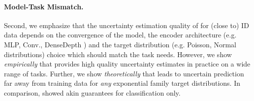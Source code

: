 \paragraph{Model-Task Mismatch.} Second, we emphasize that the uncertainty estimation quality of \NatPNacro{} for (close to) ID data depends on the convergence of the model, the encoder architecture (e.g. MLP, Conv., DenseDepth \citep{dense-depth}) and the target distribution (e.g. Poisson, Normal distributions) choice which should match the task needs. However, we show \emph{empirically} that \NatPNacro{} provides high quality uncertainty estimates in practice on a wide range of tasks. Further, we show \emph{theoretically} that \NatPNacro{} leads to uncertain prediction far away from training data for \emph{any} exponential family target distributions. In comparison, \cite{provable-uncertainty} showed akin guarantees for classification only.